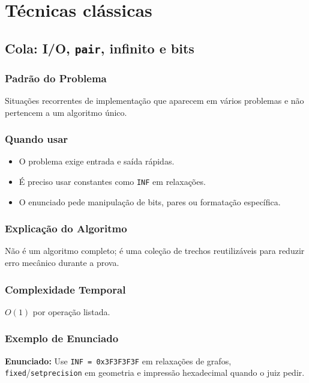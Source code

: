 \chapter{Técnicas clássicas}

\section{Cola: I/O, \texttt{pair}, infinito e bits}

\subsection{Padrão do Problema}
Situações recorrentes de implementação que aparecem em vários problemas e não pertencem a um algoritmo único.

\subsection{Quando usar}
\begin{itemize}[nosep]
  \item O problema exige entrada e saída rápidas.
  \item É preciso usar constantes como \texttt{INF} em relaxações.
  \item O enunciado pede manipulação de bits, pares ou formatação específica.
\end{itemize}

\subsection{Explicação do Algoritmo}
Não é um algoritmo completo; é uma coleção de trechos reutilizáveis para reduzir erro mecânico durante a prova.

\subsection{Complexidade Temporal}
$O(1)$ por operação listada.

\subsection{Exemplo de Enunciado}
\begin{exemplodiabox}
\textbf{Enunciado:} Use \texttt{INF = 0x3F3F3F3F} em relaxações de grafos, \texttt{fixed}/\texttt{setprecision} em geometria e impressão hexadecimal quando o juiz pedir.
\end{exemplodiabox}

